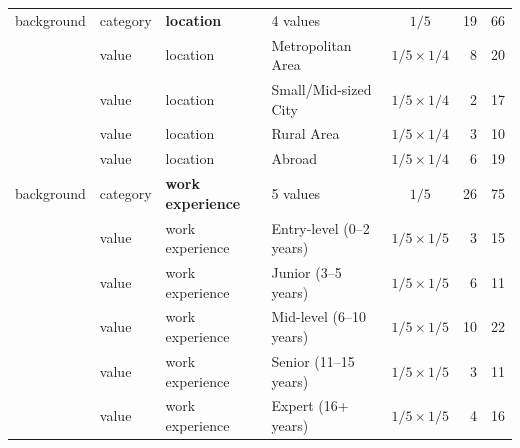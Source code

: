 \documentclass{ieeeaccess}
\begin{document}
\begin{table}[H]
\begin{tabularx}{\textwidth}{l l l X c r r}
background & category & \textbf{location} & 4 values & $1/5$ & 19 & 66 \\
 & value & location & Metropolitan Area & $1/5\times1/4$ & 8 & 20 \\
 & value & location & Small/Mid-sized City & $1/5\times1/4$ & 2 & 17 \\
 & value & location & Rural Area & $1/5\times1/4$ & 3 & 10 \\
 & value & location & Abroad & $1/5\times1/4$ & 6 & 19 \\
background & category & \textbf{work experience} & 5 values & $1/5$ & 26 & 75 \\
 & value & work experience & Entry-level (0--2 years) & $1/5\times1/5$ & 3 & 15 \\
 & value & work experience & Junior (3--5 years) & $1/5\times1/5$ & 6 & 11 \\
 & value & work experience & Mid-level (6--10 years) & $1/5\times1/5$ & 10 & 22 \\
 & value & work experience & Senior (11--15 years) & $1/5\times1/5$ & 3 & 11 \\
 & value & work experience & Expert (16+ years) & $1/5\times1/5$ & 4 & 16 \\
\bottomrule
\end{tabularx}
\end{table}
\end{document}

